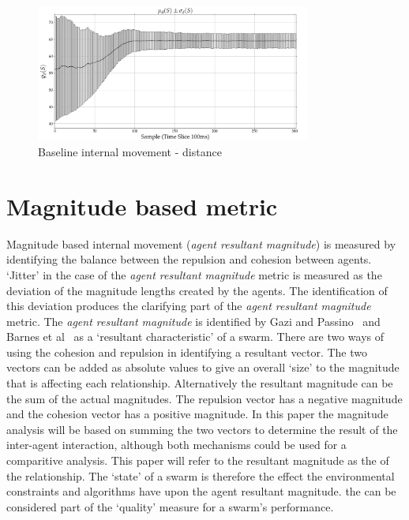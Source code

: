 \documentclass[10pt,journal,letterpaper,twoside]{IEEEtran}
\begin{document}
\begin{figure}[H]
\begin{center}
\includegraphics[width=9cm]{figures/BaselineDistance1}
\end{center}
\caption{Baseline internal movement - distance\label{coord:BaselineDistance1}}
\end{figure}

\section{Magnitude based metric\label{section:MagnitudeDynamics}}
Magnitude based internal movement (\textit{agent resultant magnitude}) is measured by identifying the balance between the repulsion and cohesion between agents. `Jitter' in the case of the \textit{agent resultant magnitude} metric is measured as the deviation of the magnitude lengths created by the agents. The identification of this deviation produces the clarifying part of the \textit{agent resultant magnitude} metric.
The \textit{agent resultant magnitude} is identified by Gazi and Passino~\cite{GP:11} and Barnes et al~\cite{BFV:07} as a `resultant characteristic' of a swarm. There are two ways of using the cohesion and repulsion in identifying a resultant vector. The two vectors can be added as absolute values to give an overall `size' to the magnitude that is affecting each relationship. Alternatively the resultant magnitude can be the sum of the actual magnitudes. The repulsion vector has a negative magnitude and the cohesion vector has a positive magnitude. In this paper the magnitude analysis will be based on summing the two vectors to determine the result of the inter-agent interaction, although both mechanisms could be used for a comparitive analysis. This paper will refer to the resultant magnitude as the  of the relationship. The `state' of a swarm is therefore the effect the environmental constraints and algorithms have upon the agent resultant magnitude. the  can be considered part of the `quality' measure for a swarm's performance.
\end{document}
